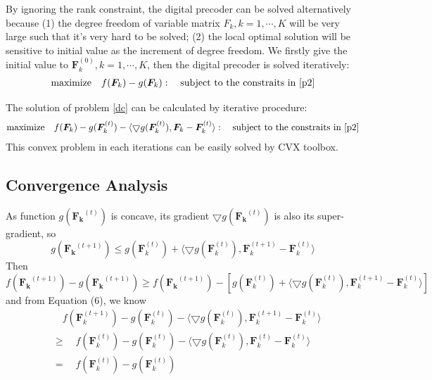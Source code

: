 \documentclass[12pt]{article}
\begin{document}
By ignoring the rank constraint, the digital precoder can be solved alternatively because (1) the degree freedom of variable matrix $F_k, k = 1,\cdots, K$ will be very large such that it's very hard to be solved; (2) the local optimal solution  will be sensitive to initial value as the increment of degree freedom.  We firstly give the initial value to $\bm{F}_k^{(0)}, k=1,\cdots,K$, then the digital precoder is solved iteratively:
\begin{align}\label{dc}
	\text{maximize} \quad f(\bm{F}_k) - g(\bm{F}_k): \quad\text{subject to the constraits in \eqref{p2}}  
\end{align}

The solution of problem \eqref{dc} can be calculated by iterative procedure:
\begin{align}\label{iter}
\text{maximize} \quad f(\bm{F}_k) - g(\bm{F}^{(t)}_k) - \langle\bigtriangledown g(\bm{F}^{(t)}_k), \bm{F}_k - \bm{F}^{(t)}_k\rangle: \quad\text{subject to the constraits in \eqref{p2}}  
\end{align}
This convex problem in each iterations can be easily solved by CVX toolbox.

\subsection{Convergence Analysis}

As function $g(\bm{F_k}^{(t)})$ is concave, its gradient $\bigtriangledown g(\bm{F_k}^{(t)})$ is also its super-gradient, so 
\begin{equation}
g(\bm{F_k}^{(t+1)}) \leq    g(\bm{F}^{(t)}_k) + \langle\bigtriangledown g(\bm{F}^{(t)}_k), \bm{F}^{(t+1)}_k - \bm{F}^{(t)}_k\rangle
\end{equation}
Then
\begin{equation}
f(\bm{F_k}^{(t+1)}) - g(\bm{F_k}^{(t+1)}) \geq  f(\bm{F_k}^{(t+1)}) - \left[  g(\bm{F}^{(t)}_k) + \langle\bigtriangledown g(\bm{F}^{(t)}_k), \bm{F}^{(t+1)}_k - \bm{F}^{(t)}_k\rangle\right]
\end{equation}
and from Equation (6), we know
\begin{align}
&\quad f(\bm{F}_k^{(t+1)}) - g(\bm{F}^{(t)}_k) - \langle\bigtriangledown g(\bm{F}^{(t)}_k), \bm{F}_k^{(t+1)} - \bm{F}^{(t)}_k\rangle  \nonumber\\
&\geq\quad f(\bm{F}^{(t)}_k) - g(\bm{F}^{(t)}_k) - \langle\bigtriangledown g(\bm{F}^{(t)}_k), \bm{F}_k^{(t)} - \bm{F}^{(t)}_k\rangle \nonumber \\
&=\quad f(\bm{F}^{(t)}_k) - g(\bm{F}^{(t)}_k)
\end{align}
\end{document}
